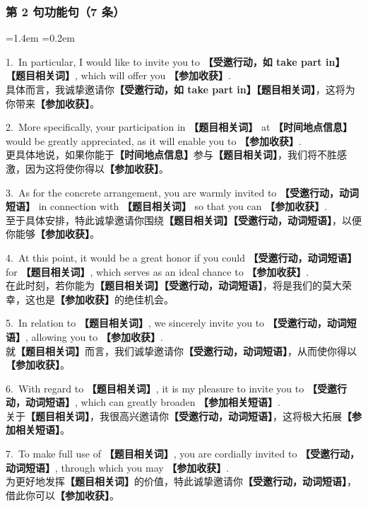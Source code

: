 \documentclass[11pt,a4paper]{ctexart}
\newcommand{\fillin}[1]{{\bfseries【#1】}}
\newenvironment{eg}{%
  \par\addvspace{4pt}%
  \begin{list}{}{\leftmargin=1.4em \rightmargin=0.2em \listparindent=0pt
    \itemindent=0pt \topsep=0pt \parsep=2pt \itemsep=2pt \partopsep=0pt}%
  \item\relax
}{%
  \end{list}\addvspace{5pt}%
}
\begin{document}
\subsubsection{第 2 句功能句（7 条）}

\begin{eg}
1.\ In particular, I would like to invite you to \fillin{受邀行动，如 take part in} \fillin{题目相关词}, which will offer you \fillin{参加收获}.\\
具体而言，我诚挚邀请你\fillin{受邀行动，如 take part in}\fillin{题目相关词}，这将为你带来\fillin{参加收获}。

2.\ More specifically, your participation in \fillin{题目相关词} at \fillin{时间地点信息} would be greatly appreciated, as it will enable you to \fillin{参加收获}.\\
更具体地说，如果你能于\fillin{时间地点信息}参与\fillin{题目相关词}，我们将不胜感激，因为这将使你得以\fillin{参加收获}。

3.\ As for the concrete arrangement, you are warmly invited to \fillin{受邀行动，动词短语} in connection with \fillin{题目相关词} so that you can \fillin{参加收获}.\\
至于具体安排，特此诚挚邀请你围绕\fillin{题目相关词}\fillin{受邀行动，动词短语}，以便你能够\fillin{参加收获}。

4.\ At this point, it would be a great honor if you could \fillin{受邀行动，动词短语} for \fillin{题目相关词}, which serves as an ideal chance to \fillin{参加收获}.\\
在此时刻，若你能为\fillin{题目相关词}\fillin{受邀行动，动词短语}，将是我们的莫大荣幸，这也是\fillin{参加收获}的绝佳机会。

5.\ In relation to \fillin{题目相关词}, we sincerely invite you to \fillin{受邀行动，动词短语}, allowing you to \fillin{参加收获}.\\
就\fillin{题目相关词}而言，我们诚挚邀请你\fillin{受邀行动，动词短语}，从而使你得以\fillin{参加收获}。

6.\ With regard to \fillin{题目相关词}, it is my pleasure to invite you to \fillin{受邀行动，动词短语}, which can greatly broaden \fillin{参加相关短语}.\\
关于\fillin{题目相关词}，我很高兴邀请你\fillin{受邀行动，动词短语}，这将极大拓展\fillin{参加相关短语}。

7.\ To make full use of \fillin{题目相关词}, you are cordially invited to \fillin{受邀行动，动词短语}, through which you may \fillin{参加收获}.\\
为更好地发挥\fillin{题目相关词}的价值，特此诚挚邀请你\fillin{受邀行动，动词短语}，借此你可以\fillin{参加收获}。
\end{eg}
\end{document}
